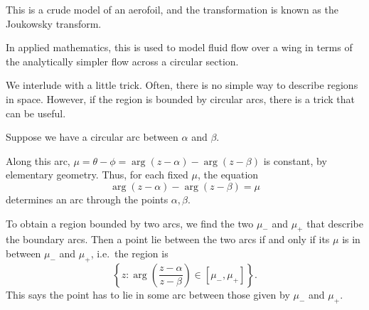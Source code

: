 \documentclass[a4paper]{article}
\begin{document}
\begin{eg}
  This is a crude model of an aerofoil, and the transformation is known as the Joukowsky transform.

  In applied mathematics, this is used to model fluid flow over a wing in terms of the analytically simpler flow across a circular section.
\end{eg}

We interlude with a little trick. Often, there is no simple way to describe regions in space. However, if the region is bounded by circular arcs, there is a trick that can be useful.

Suppose we have a circular arc between $\alpha$ and $\beta$.
\begin{center}
\end{center}
Along this arc, $\mu = \theta - \phi = \arg(z - \alpha) - \arg(z - \beta)$ is constant, by elementary geometry. Thus, for each fixed $\mu$, the equation
\[
  \arg(z - \alpha) - \arg(z - \beta) = \mu
\]
determines an arc through the points $\alpha, \beta$.

To obtain a region bounded by two arcs, we find the two $\mu_-$ and $\mu_+$ that describe the boundary arcs. Then a point lie between the two arcs if and only if its $\mu$ is in between $\mu_-$ and $\mu_+$, i.e.\ the region is
\[
  \left\{z: \arg\left(\frac{z - \alpha}{z - \beta}\right) \in [\mu_-, \mu_+]\right\}.
\]
This says the point has to lie in some arc between those given by $\mu_-$ and $\mu_+$.
\end{document}
